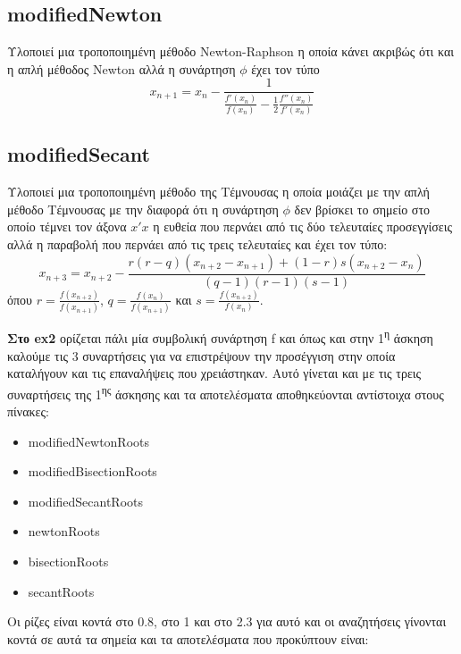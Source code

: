 \documentclass[a4paper,11pt]{article}
\begin{document}
\begin{flushleft}
\subsection*{modifiedNewton}
Υλοποιεί μια τροποποιημένη μέθοδο Newton-Raphson η οποία κάνει ακριβώς ότι και η απλή μέθοδος Newton αλλά η συνάρτηση $\phi$ έχει τον τύπο $$x_{n+1} = x_n-\frac{1}{\frac{f'(x_n)}{f(x_n)}-\frac{1}{2}\frac{f''(x_n)}{f'(x_n)}}$$
\linebreak

\subsection*{modifiedSecant}
Υλοποιεί μια τροποποιημένη μέθοδο της Τέμνουσας η οποία μοιάζει με την απλή μέθοδο Τέμνουσας με την διαφορά ότι η συνάρτηση $\phi$ δεν βρίσκει το σημείο στο οποίο τέμνει τον άξονα $x'x$ η ευθεία που περνάει από τις δύο τελευταίες προσεγγίσεις αλλά η παραβολή που περνάει από τις τρεις τελευταίες και έχει τον τύπο: 
$$x_{n+3} = x_{n+2} - \frac{r(r-q)(x_{n+2}-x_{n+1})+(1-r)s(x_{n+2}-x_n)}{(q-1)(r-1)(s-1)}$$
όπου $r = \frac{f(x_{n+2})}{f(x_{n+1})}$, $q = \frac{f(x_n)}{f(x_{n+1})}$ και $s = \frac{f(x_{n+2})}{f(x_n)}$.
\linebreak

\textbf{Στο ex2} ορίζεται πάλι μία συμβολική συνάρτηση f και όπως και στην 1\textsuperscript{η} άσκηση καλούμε τις 3 συναρτήσεις για να επιστρέψουν την προσέγγιση στην οποία καταλήγουν και τις επαναλήψεις που χρειάστηκαν. Αυτό γίνεται και με τις τρεις συναρτήσεις της 1\textsuperscript{ης} άσκησης και τα αποτελέσματα αποθηκεύονται αντίστοιχα στους πίνακες: 
\begin{itemize}
    \item modifiedNewtonRoots
    \item modifiedBisectionRoots
    \item modifiedSecantRoots
    \item newtonRoots
    \item bisectionRoots
    \item secantRoots
\end{itemize}

Οι ρίζες είναι κοντά στο 0.8, στο 1 και στο 2.3 για αυτό και οι αναζητήσεις γίνονται κοντά σε αυτά τα σημεία και τα αποτελέσματα που προκύπτουν είναι:


\end{flushleft}
\end{document}
